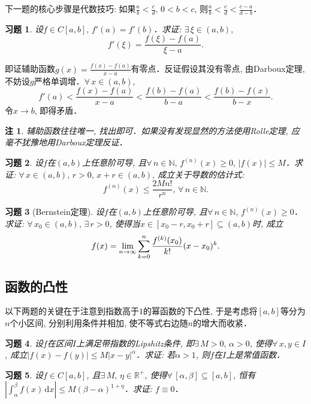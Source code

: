 \documentclass[11pt,a4paper]{ctexart}
\makeatletter
\theoremstyle{thmseries} %
\theoremstyle{exerseries}
\newtheorem{exer}{习题}[section]
\newtheorem*{rem}{注}
\renewenvironment{proof}[1][\proofname]{\par
  \pushQED{\qed}%
  \normalfont \topsep6\p@\@plus6\p@\relax
  \trivlist
  \item[\hskip\labelsep
        \itshape
    #1\@addpunct{}]\ignorespaces
}{%
  \popQED\endtrivlist\@endpefalse
}
\newenvironment{pf}{\begin{proof}[\bfseries\upshape 证\quad]}{\end{proof}}
\newcommand{\R}{\mathbb{R}}
\newcommand{\N}{\mathbb{N}}
\renewcommand{\d}{\mathrm{d}}
\def \nti {\mathnormal{n}\to\infty}
\makeatother
\begin{document}
下一题的核心步骤是代数技巧: 如果$\frac{a}{b}<\frac{c}{d},\,0<b<c$, 则$\frac{a}{b}<\frac{c}{d}<\frac{c-a}{d-b}$．
\begin{exer}
	设$f\in C[a,b],\,f'(a)=f'(b)$．求证: $\exists\,\xi\in(a,b),$
	\[f'(\xi)=\frac{f(\xi)-f(a)}{\xi-a}.\]
\end{exer}
\begin{pf}
	即证辅助函数$g(x)=\frac{f(x)-f(a)}{x-a}$有零点．反证假设其没有零点, 由Darboux定理, 不妨设$g$严格单调增．$\forall\,x\in(a,b),$
	\[f'(a)<\frac{f(x)-f(a)}{x-a}<\frac{f(b)-f(a)}{b-a}<\frac{f(b)-f(x)}{b-x}.\]
	令$x\to b$, 即得矛盾．
\end{pf}
\begin{rem}
	辅助函数往往唯一, 找出即可．如果没有发现显然的方法使用Rolle定理, 应毫不犹豫地用Darboux定理反证．
\end{rem}

\begin{exer}
	设$f$在$(a,b)$上任意阶可导, 且$\forall\,n\in\N,\,f^{(n)}(x)\geq0,\,|f(x)|\leq M$．求证: $\forall\,x\in(a,b),\,r>0,\,x+r\in(a,b)$, 成立关于导数的估计式:
	\[f^{(n)}(x)\leq\frac{2Mn!}{r^n},\,\forall\,n\in\N.\]
\end{exer}

\begin{exer}[Bernstein定理]
	设$f$在$(a,b)$上任意阶可导, 且$\forall\,n\in\N,\,f^{(n)}(x)\geq0$．求证: $\forall\,x_0\in(a,b),\,\exists\,r>0$, 使得当$x\in[x_0-r,x_0+r]\subseteq(a,b)$时, 成立
	\[f(x)=\lim_{\nti}\sum_{k=0}^{n}\frac{f^{(k)}(x_0)}{k!}(x-x_0)^k.\]
\end{exer}


\subsection{函数的凸性}
以下两题的关键在于注意到指数高于$1$的幂函数的下凸性, 于是考虑将$[a,b]$等分为$n$个小区间, 分别利用条件并相加, 使不等式右边随$n$的增大而收紧．
\begin{exer}
	设$f$在区间$I$上满足带指数的Lipshitz条件, 即$\exists\,M>0,\,\alpha>0$, 使得$\forall\,x,y\in I$, 成立$|f(x)-f(y)|\leq M|x-y|^\alpha$．求证: 若$\alpha>1$, 则$f$在$I$上是常值函数．
\end{exer}

\begin{exer}
	设$f\in C[a,b]$, 且$\exists\,M,\,\eta\in\R^+$, 使得$\forall\,[\alpha,\beta]\subseteq[a,b]$, 恒有$\left|\int_{\alpha}^{\beta}f(x)\,\d x\right|\leq M(\beta-\alpha)^{1+\eta}$．求证: $f\equiv0$．
\end{exer}
\end{document}
